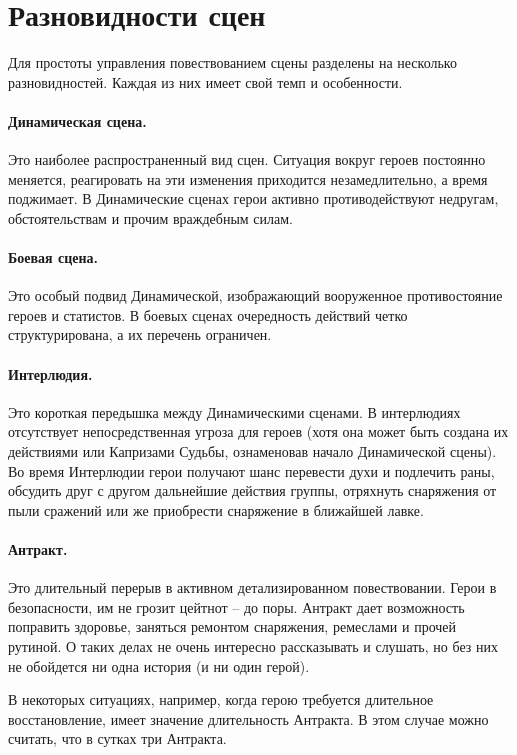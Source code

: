 \section{Разновидности сцен}
Для простоты управления повествованием сцены разделены на несколько разновидностей. Каждая из них имеет свой темп и особенности. 
\paragraph{Динамическая сцена.} Это наиболее распространенный вид сцен. Ситуация вокруг героев постоянно меняется, реагировать на эти изменения приходится незамедлительно, а время поджимает. В Динамические сценах герои активно противодействуют недругам, обстоятельствам и прочим враждебным силам. 
\paragraph{Боевая сцена.} Это особый подвид Динамической, изображающий вооруженное противостояние героев и статистов. В боевых сценах очередность действий четко структурирована, а их перечень ограничен.
\paragraph{Интерлюдия.} Это короткая передышка между Динамическими сценами. В интерлюдиях отсутствует непосредственная угроза для героев (хотя она может быть создана их действиями или Капризами Судьбы, ознаменовав начало Динамической сцены). Во время Интерлюдии герои получают шанс перевести духи и подлечить раны, обсудить друг с другом дальнейшие действия группы, отряхнуть снаряжения от пыли сражений или же приобрести снаряжение в ближайшей лавке.
\paragraph{Антракт.} Это длительный перерыв в активном детализированном повествовании. Герои в безопасности, им не грозит цейтнот – до поры. Антракт дает возможность поправить здоровье, заняться ремонтом снаряжения, ремеслами и прочей рутиной. О таких делах не очень интересно рассказывать и слушать, но без них не обойдется ни одна история (и ни один герой). 
\begin{tcolorbox}
В некоторых ситуациях, например, когда герою требуется длительное восстановление, имеет значение длительность Антракта. В этом случае можно считать, что в сутках три Антракта.
\end{tcolorbox}
